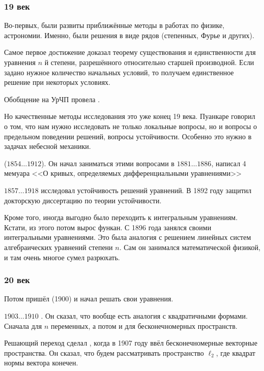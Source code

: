 \documentclass[a4paper,oneside,fleqn,10pt]{article}
\newcommand{\pe}[2]{${#1}\ldots{#2}$}
\begin{document}
\subsubsection{19 век}

Во-первых, были развиты приближённые методы в работах по физике,
астрономии.  Именно, были решения в виде рядов (степенных, Фурье и
других).

Самое первое достижение  доказал теорему существования и
единственности для уравнения $n$ й степени, разрешённого относительно
старшей производной.  Если задано нужное количество начальных условий,
то получаем единственное решение при некоторых условиях.

Обобщение на УрЧП провела .

Но качественные методы исследования это уже конец 19 века.  Пуанкаре
говорил о том, что нам нужно исследовать не только локальные вопросы,
но и вопросы о предельном поведении решений, вопросы устойчивости.
Особенно это нужно в задачах небесной механики.

 (\pe{1854}{1912}). Он начал заниматься этими вопросами
в \pe{1881}{1886}, написал 4 мемуара <<О кривых, определяемых
дифференциальными уравнениями>>

 \pe{1857}{1918} исследовал
устойчивость решений уравнений.  В 1892 году защитил докторскую
диссертацию по теории устойчивости.

Кроме того, иногда выгодно было переходить к интегральным уравнениям.
Кстати, из этого потом вырос функан. С 1896 года  занялся своими интегральными
уравнениями. Это была аналогия с решением линейных систем
алгебраических уравнений степени $n$. Сам он занимался математической
физикой, и там очень многое сумел разрюхать.

\subsubsection{20 век}

Потом пришёл  (1900) и начал решать свои уравнения.

\pe{1903}{1910} . Он сказал, что вообще есть аналогия с
квадратичными формами.  Сначала для $n$ переменных, а потом и для
бесконечномерных пространств.

Решающий переход сделал , когда в 1907 году ввёл
бесконечномерные векторные пространства.  Он сказал, что будем
рассматривать пространство $\ell_2$, где квадрат нормы вектора
конечен.
\end{document}
